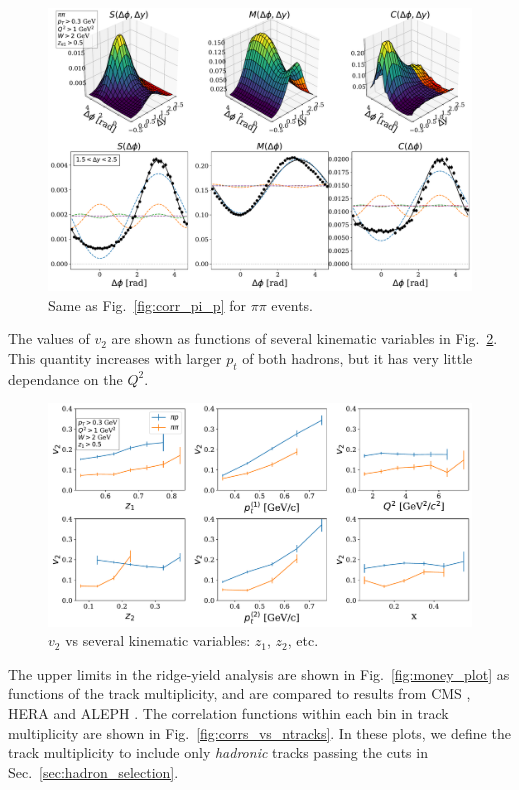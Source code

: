 \begin{figure}
    \centering
    \includegraphics[width=\textwidth]{smc_pi_pi.pdf}
    \caption{Same as Fig.~\ref{fig:corr_pi_p} for $\pi\pi$ events.}
    \label{fig:corr_pi_pi}
\end{figure}

The values of $v_2$ are shown as functions of several kinematic variables in Fig.~\ref{fig:v2_vs_stuff}.  This quantity increases with larger $p_t$ of both hadrons, but it has very little dependance on the $Q^2$.  

\begin{figure}
    \centering
    \includegraphics[width=\textwidth]{v2_vs_stuff1.pdf}
    \caption{$v_2$ vs several kinematic variables: $z_1$, $z_2$, etc.}
    \label{fig:v2_vs_stuff}
\end{figure}

The upper limits in the ridge-yield analysis are shown in Fig.~\ref{fig:money_plot} as functions of the track multiplicity, and are compared to results from CMS \cite{Khachatryan:2010gv,CMS:2012qk,Khachatryan:2015lva}, HERA and ALEPH \cite{Lee:2019tmr}.  The correlation functions within each bin in track multiplicity are shown in Fig.~\ref{fig:corrs_vs_ntracks}.  In these plots, we define the track multiplicity to include only \textit{hadronic} tracks passing the cuts in Sec.~\ref{sec:hadron_selection}.  

